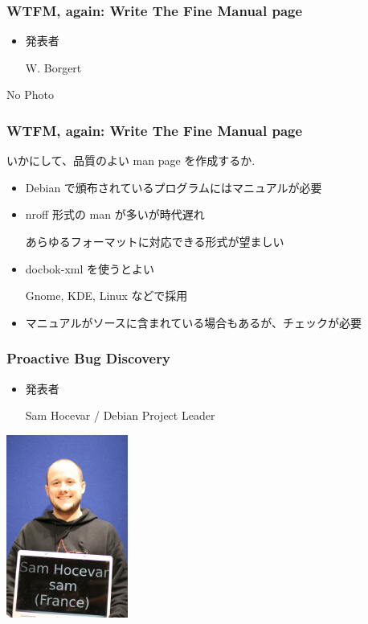 \documentclass[cjk,dvipdfmx,12pt]{beamer}
\begin{document}
\begin{frame} 
\frametitle{WTFM, again: Write The Fine Manual page}
  \begin{minipage}{0.4\hsize}
    \begin{itemize}
      \item 発表者

	W. Borgert
    \end{itemize}
  \end{minipage}
  \begin{minipage}{0.4\hsize}
    No Photo  
  \end{minipage}
\end{frame}

\begin{frame} 
\frametitle{WTFM, again: Write The Fine Manual page}
  いかにして、品質のよい man page を作成するか.

  \begin{itemize}
    \item Debian で頒布されているプログラムにはマニュアルが必要
    \item nroff 形式の man が多いが時代遅れ

	あらゆるフォーマットに対応できる形式が望ましい
    \item docbok-xml を使うとよい
	
	Gnome, KDE, Linux などで採用
    \item マニュアルがソースに含まれている場合もあるが、チェックが必要
  \end{itemize}	
\end{frame}

\begin{frame} 
\frametitle{Proactive Bug Discovery}
  \begin{minipage}{0.4\hsize}
    \begin{itemize}
      \item 発表者

	Sam Hocevar / Debian Project Leader
    \end{itemize}
  \end{minipage}
  \begin{minipage}{0.4\hsize}
    \includegraphics[width=4cm]{image200707/sam.jpg}
  \end{minipage}
\end{frame}
\end{document}
